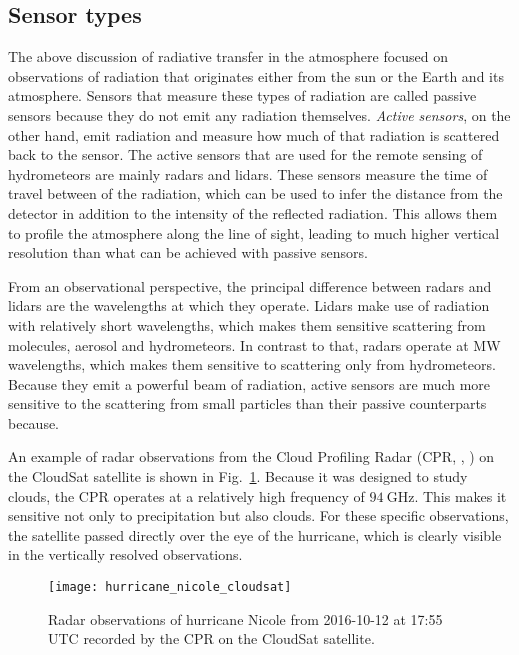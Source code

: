 \subsection{Sensor types}

The above discussion of radiative transfer in the atmosphere focused on
observations of radiation that originates either from the sun or the Earth and
its atmosphere. Sensors that measure these types of radiation are called passive
sensors because they do not emit any radiation themselves. \textit{Active
sensors}, on the other hand, emit radiation and measure how much of that
radiation is scattered back to the sensor. The active sensors that are used for
the remote sensing of hydrometeors are mainly radars and lidars. These sensors
measure the time of travel between of the radiation, which can be used to
infer the distance from the detector in addition to the intensity of the
reflected radiation. This allows them to profile the atmosphere along the line
of sight, leading to much higher vertical resolution than what can be achieved
with passive sensors.

From an observational perspective, the principal difference between radars and
lidars are the wavelengths at which they operate. Lidars make use of radiation with
relatively short wavelengths, which makes them sensitive scattering from
molecules, aerosol and hydrometeors. In contrast to that, radars operate at MW
wavelengths, which makes them sensitive to scattering only from hydrometeors.
Because they emit a powerful beam of radiation, active sensors are much more
sensitive to the scattering from small particles than their passive
counterparts because.

An example of radar observations from the Cloud Profiling Radar
(CPR, \citeauthor{tanelli08}, \citeyear{tanelli08}) on the CloudSat satellite is
shown in Fig.~\ref{fig:radiative_transfer:cloud_sat}. Because it was designed to
study clouds, the CPR operates at a relatively high frequency of
$\SI{94}{\giga \hertz}$. This makes it sensitive not only to precipitation but
also clouds. For these specific observations, the satellite passed directly over
the eye of the hurricane, which is clearly visible in the vertically resolved
observations.

\begin{figure}
\centering
\texttt{[image: hurricane\_nicole\_cloudsat]}
\caption{
Radar observations of hurricane Nicole from 2016-10-12 at
17:55 UTC recorded by the CPR on the CloudSat satellite.
}
\label{fig:radiative_transfer:cloud_sat}
\end{figure}

